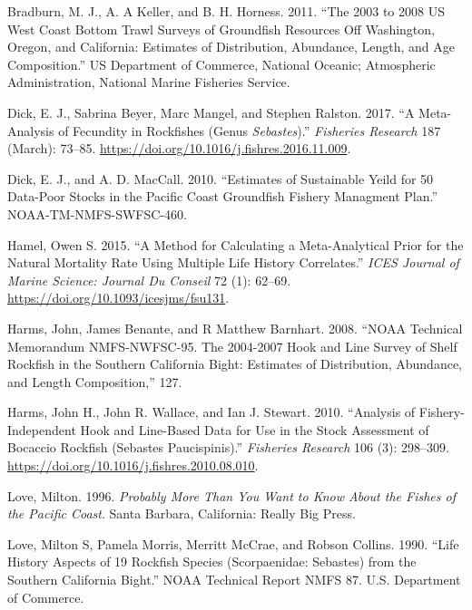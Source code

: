 \documentclass[11pt,
  english,
  a4paper,
]{article}
\begin{document}
\hypertarget{refs}{}
\begin{cslreferences}
\leavevmode\hypertarget{ref-bradburn_2003_2011}{}%
Bradburn, M. J., A. A Keller, and B. H. Horness. 2011. ``The 2003 to 2008 US West Coast Bottom Trawl Surveys of Groundfish Resources Off Washington, Oregon, and California: Estimates of Distribution, Abundance, Length, and Age Composition.'' US Department of Commerce, National Oceanic; Atmospheric Administration, National Marine Fisheries Service.

\leavevmode\hypertarget{ref-dick_meta-analysis_2017}{}%
Dick, E. J., Sabrina Beyer, Marc Mangel, and Stephen Ralston. 2017. ``A Meta-Analysis of Fecundity in Rockfishes (Genus \emph{Sebastes}).'' \emph{Fisheries Research} 187 (March): 73--85. \url{https://doi.org/10.1016/j.fishres.2016.11.009}.

\leavevmode\hypertarget{ref-dick_estimates_2010}{}%
Dick, E. J., and A. D. MacCall. 2010. ``Estimates of Sustainable Yeild for 50 Data-Poor Stocks in the Pacific Coast Groundfish Fishery Managment Plan.'' NOAA-TM-NMFS-SWFSC-460.

\leavevmode\hypertarget{ref-hamel_method_2015}{}%
Hamel, Owen S. 2015. ``A Method for Calculating a Meta-Analytical Prior for the Natural Mortality Rate Using Multiple Life History Correlates.'' \emph{ICES Journal of Marine Science: Journal Du Conseil} 72 (1): 62--69. \url{https://doi.org/10.1093/icesjms/fsu131}.

\leavevmode\hypertarget{ref-harms_noaa_2008}{}%
Harms, John, James Benante, and R Matthew Barnhart. 2008. ``NOAA Technical Memorandum NMFS-NWFSC-95. The 2004-2007 Hook and Line Survey of Shelf Rockfish in the Southern California Bight: Estimates of Distribution, Abundance, and Length Composition,'' 127.

\leavevmode\hypertarget{ref-harms_analysis_2010}{}%
Harms, John H., John R. Wallace, and Ian J. Stewart. 2010. ``Analysis of Fishery-Independent Hook and Line-Based Data for Use in the Stock Assessment of Bocaccio Rockfish (Sebastes Paucispinis).'' \emph{Fisheries Research} 106 (3): 298--309. \url{https://doi.org/10.1016/j.fishres.2010.08.010}.

\leavevmode\hypertarget{ref-love_milton_probably_1996}{}%
Love, Milton. 1996. \emph{Probably More Than You Want to Know About the Fishes of the Pacific Coast}. Santa Barbara, California: Really Big Press.

\leavevmode\hypertarget{ref-love_life_1990}{}%
Love, Milton S, Pamela Morris, Merritt McCrae, and Robson Collins. 1990. ``Life History Aspects of 19 Rockfish Species (Scorpaenidae: Sebastes) from the Southern California Bight.'' NOAA Technical Report NMFS 87. U.S. Department of Commerce.


\end{cslreferences}
\end{document}
